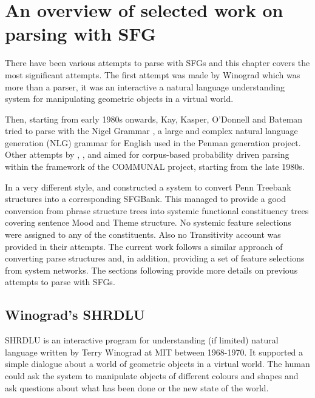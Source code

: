 \chapter{An overview of selected work on parsing with SFG}
\label{ch:sota}

\label{sec:sota}
There have been various attempts to parse with SFGs and this chapter covers the most significant attempts. The first attempt was made by Winograd \citep{Winograd1972} which was more than a parser, it was an interactive a natural language understanding system for manipulating geometric objects in a virtual world.

Then, starting from early 1980s onwards, Kay, Kasper, O'Donnell and Bateman tried to parse with the Nigel Grammar \citep{Matthiessen1985}, a large and complex natural language generation (NLG) grammar for English used in the Penman generation project. Other attempts by \citet{ODonoghue1991a}, \citet{Weerasinghe1994}, \citet{Souter1996} and \citet{Day2007} aimed for corpus-based probability driven parsing within the framework of the COMMUNAL project, starting from the late 1980s.

In a very different style, \citet{Honnibal2004a} and \citet{Honnibal2007} constructed a system to convert Penn Treebank structures into a corresponding SFGBank. This managed to provide a good conversion from phrase structure trees into systemic functional constituency trees covering sentence Mood and Theme structure. No systemic feature selections were assigned to any of the constituents. Also no Transitivity account was provided in their attempts. The current work follows a similar approach of converting parse structures and, in addition, providing a set of feature selections from system networks. The sections following provide more details on previous attempts to parse with SFGs. 

\section{Winograd's SHRDLU}

SHRDLU is an interactive program for understanding (if limited) natural language written by Terry Winograd at MIT between 1968-1970. It supported a simple dialogue about a world of geometric objects in a virtual world. The human could ask the system to manipulate objects of different colours and shapes and ask questions about what has been done or the new state of the world. 

